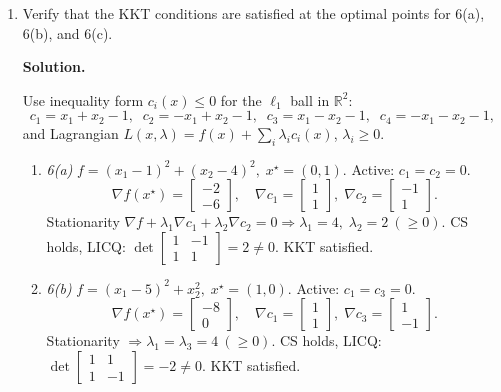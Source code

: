 \documentclass[11pt]{article}
\begin{document}
\begin{enumerate}[label=6(\alph*)]
	\item Verify that the KKT conditions are satisfied at the optimal points for
	6(a), 6(b), and 6(c).
	
	\textbf{Solution.}
	
	Use inequality form $c_i(x)\le 0$ for the $\ell_1$ ball in $\mathbb{R}^2$:
	\[
	c_1=x_1+x_2-1,\;\; c_2=-x_1+x_2-1,\;\; c_3=x_1-x_2-1,\;\; c_4=-x_1-x_2-1,
	\]
	and Lagrangian \(L(x,\lambda)=f(x)+\sum_i\lambda_i c_i(x)\), \(\lambda_i\ge 0\).
	
	\begin{enumerate}[label=\arabic*)]
		\item \emph{6(a)} \(f=(x_1-1)^2+(x_2-4)^2,\; x^\star=(0,1)\).  
		Active: \(c_1=c_2=0\).  
		\[
		\nabla f(x^\star)=\begin{bmatrix}-2\\-6\end{bmatrix},\quad
		\nabla c_1=\begin{bmatrix}1\\1\end{bmatrix},\;
		\nabla c_2=\begin{bmatrix}-1\\1\end{bmatrix}.
		\]
		Stationarity \(\nabla f+\lambda_1\nabla c_1+\lambda_2\nabla c_2=0\Rightarrow
		\lambda_1=4,\;\lambda_2=2\ (\ge0).\)  
		CS holds, LICQ: \(\det\!\begin{bmatrix}1&-1\\1&1\end{bmatrix}=2\neq0\). KKT satisfied.
		
		\item \emph{6(b)} \(f=(x_1-5)^2+x_2^2,\; x^\star=(1,0)\).  
		Active: \(c_1=c_3=0\).  
		\[
		\nabla f(x^\star)=\begin{bmatrix}-8\\0\end{bmatrix},\quad
		\nabla c_1=\begin{bmatrix}1\\1\end{bmatrix},\;
		\nabla c_3=\begin{bmatrix}1\\-1\end{bmatrix}.
		\]
		Stationarity \(\Rightarrow \lambda_1=\lambda_3=4\ (\ge0)\).  
		CS holds, LICQ: \(\det\!\begin{bmatrix}1&1\\1&-1\end{bmatrix}=-2\neq0\). KKT satisfied.
		

\end{enumerate}
\end{enumerate}
\end{document}
